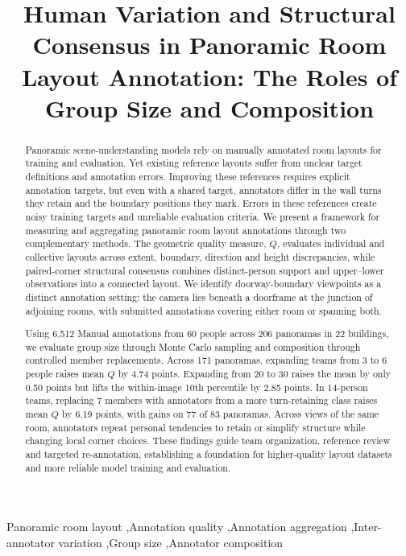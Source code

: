 \documentclass[final,5p,twocolumn]{elsarticle}
\begin{document}
\raggedbottom
\begin{frontmatter}
\title{\bfseries Human Variation and Structural Consensus in Panoramic Room Layout Annotation: The Roles of Group Size and Composition}
\author{}
\begin{abstract}
Panoramic scene-understanding models rely on manually annotated room layouts for training and evaluation. Yet existing reference layouts suffer from unclear target definitions and annotation errors. Improving these references requires explicit annotation targets, but even with a shared target, annotators differ in the wall turns they retain and the boundary positions they mark. Errors in these references create noisy training targets and unreliable evaluation criteria. We present a framework for measuring and aggregating panoramic room layout annotations through two complementary methods. The geometric quality measure, $Q$, evaluates individual and collective layouts across extent, boundary, direction and height discrepancies, while paired-corner structural consensus combines distinct-person support and upper--lower observations into a connected layout. We identify doorway-boundary viewpoints as a distinct annotation setting: the camera lies beneath a doorframe at the junction of adjoining rooms, with submitted annotations covering either room or spanning both.

Using 6,512 Manual annotations from 60 people across 206 panoramas in 22 buildings, we evaluate group size through Monte Carlo sampling and composition through controlled member replacements. Across 171 panoramas, expanding teams from 3 to 6 people raises mean $Q$ by 4.74 points. Expanding from 20 to 30 raises the mean by only 0.50 points but lifts the within-image 10th percentile by 2.85 points. In 14-person teams, replacing 7 members with annotators from a more turn-retaining class raises mean $Q$ by 6.19 points, with gains on 77 of 83 panoramas. Across views of the same room, annotators repeat personal tendencies to retain or simplify structure while changing local corner choices. These findings guide team organization, reference review and targeted re-annotation, establishing a foundation for higher-quality layout datasets and more reliable model training and evaluation.
\end{abstract}
\begin{keyword}
Panoramic room layout \sep Annotation quality \sep Annotation aggregation \sep Inter-annotator variation \sep Group size \sep Annotator composition
\end{keyword}
\end{frontmatter}
\end{document}
